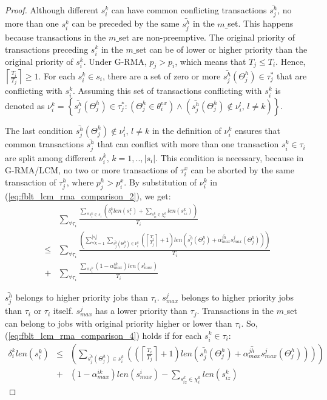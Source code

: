 \documentclass[a4paper,english]{article}
\newtheorem{proof}{Proof}
\begin{document}
\begin{proof}
Although different $s_{i}^{k}$ can have common conflicting transactions
$\bar{s_{j}^{h}}$, no more than one $s_{i}^{k}$ can be preceded
by the same $\bar{s_{j}^{h}}$ in the $m\_$set. This happens because
transactions in the $m\_$set are non-preemptive. The original priority
of transactions preceding $s_{i}^{k}$ in the $m\_$set can be of
lower or higher priority than the original priority of $s_{i}^{k}$. Under
G-RMA, $p_{j}>p_{i}$, which means that $T_{j}\le T_{i}$. Hence, $\left\lceil \frac{T_{i}}{T_{j}}\right\rceil \ge1$.
For each $s_{i}^{k}\in s_{i}$, there are a set of zero or more $\bar{s_{j}^{h}}(\Theta_j^h)\in\tau_{j}^{*}$
that are conflicting with $s_{i}^{k}$. Assuming this set of transactions conflicting with $s_{i}^{k}$ is denoted as $\nu_{i}^{k}=\left\{ \bar{s_{j}^{h}}(\Theta_j^h)\in\tau_{j}^{*}:\left(\Theta_j^h\in\theta_{i}^{ex}\right)\wedge\left(\bar{s_{j}^{h}}(\Theta_j^h)\not\in\nu_{i}^{l},\, l\ne k\right)\right\} $.


The last condition $\bar{s_{j}^{h}}(\Theta_j^h)\not\in\nu_{i}^{l},\, l\ne k$
in the definition of $\nu_{i}^{k}$ ensures that common transactions
$\bar{s_{j}^{h}}$ that can conflict with more than one transaction
$s_{i}^{k}\in\tau_{i}$ are split among different $\nu_{i}^{k},\, k=1,..,|s_{i}|$.
This condition is necessary, because in G-RMA/LCM, no two or more transactions
of $\tau_{i}^{x}$ can be aborted by the same transaction of $\tau_{j}^{h}$, 
where $p_{j}^{h}>p_{i}^{x}$. By substitution of $\nu_{i}^{k}$ in
(\ref{eq:fblt_lcm_rma_comparison_2}), we get: 
\begin{eqnarray}
 & \sum_{\forall\tau_{i}}\frac{\sum_{\forall s_{i}^{k}\in s_{i}}\left(\delta_i^klen(s_{i}^{k})+\sum_{s_{iz}^{k}\in\chi_{i}^{k}}len(s_{iz}^{k})\right)}{T_{i}}\label{eq:fblt_lcm_rma_comparison_4}\\
\le & \sum_{\forall\tau_{i}}\frac{\left(\sum_{\forall k=1}^{|s_{i}|}\sum_{\bar{s_{j}^{h}}(\Theta_j^h)\in\nu_{i}^{k}}\left(\left\lceil \frac{T_{i}}{T_{j}}\right\rceil +1\right)len\left(\bar{s_{j}^{h}}(\Theta_j^h)+\bar{\alpha_{max}^{jh}}s_{max}^{j}(\Theta_j^h)\right)\right)}{T_{i}}\nonumber \\
+ & \sum_{\forall\tau_{i}}\frac{\sum_{\forall s_{i}^{k}}\left(1-\alpha_{max}^{ik}\right)len(s_{max}^{i})}{T_{i}}\nonumber 
\end{eqnarray}

$\bar{s_{j}^{h}}$ belongs to higher priority jobs than $\tau_{i}$. $s_{max}^{j}$ belongs to higher priority jobs than $\tau_{i}$ or $\tau_{i}$ itself. $s_{max}^{j}$ has a lower priority than $\tau_j$. Transactions in the $m\_$set can belong to jobs
with original priority higher or lower than $\tau_{i}$. So, (\ref{eq:fblt_lcm_rma_comparison_4})
holds if for each $s_{i}^{k}\in\tau_{i}$: 
\begin{eqnarray}
\delta_i^klen(s_{i}^{k}) & \le & \left(\sum_{\bar{s_{j}^{h}}(\Theta_j^h)\in\nu_{i}^{k}}\left(\left(\left\lceil \frac{T_{i}}{T_{j}}\right\rceil +1\right)len\left(\bar{s_{j}^{h}}(\Theta_j^h)+\bar{\alpha_{max}^{jh}}s_{max}^{j}(\Theta_j^h)\right)\right)\right)\nonumber\\
 & + & \left(1-\alpha_{max}^{ik}\right)len(s_{max}^{i})-\sum_{s_{iz}^{k}\in\chi_{i}^{k}}len(s_{iz}^{k})
 \nonumber
\end{eqnarray}


\end{proof}
\end{document}
